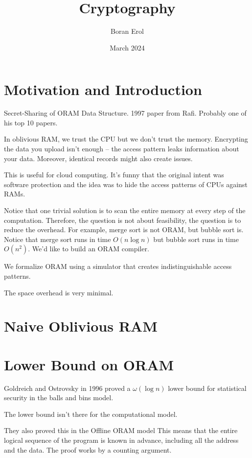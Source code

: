 \documentclass{article}
\title{Cryptography}
\date{March 2024}
\author{Boran Erol}
\theoremstyle{definition}
\begin{document}
\maketitle

\section{Motivation and Introduction}

Secret-Sharing of ORAM Data Structure. 1997 paper from Rafi. Probably one of his top 10 papers.

In oblivious RAM, we trust the CPU but we don't trust the memory. Encrypting the data you upload isn't enough -- 
the access pattern leaks information about your data. Moreover, identical records might also create issues.

This is useful for cloud computing. It's funny that the original intent was software protection and the idea
was to hide the access patterns of CPUs against RAMs.

Notice that one trivial solution is to scan the entire memory at every step of the computation.
Therefore, the question is not about feasibility, the question is to reduce the overhead.
For example, merge sort is not ORAM, but bubble sort is. Notice that merge sort runs in time $O(n \log n)$
but bubble sort runs in time $O(n^2)$.
We'd like to build an ORAM compiler.

We formalize ORAM using a simulator that creates indistinguishable access patterns.

The space overhead is very minimal.


\newpage

\section{Naive Oblivious RAM}



\newpage

\section{Lower Bound on ORAM}

Goldreich and Ostrovsky in 1996 proved a $\omega(\log n)$ lower bound for statistical security in the
balls and bins model.

The lower bound isn't there for the computational model.

They also proved this in the Offline ORAM model This means that the entire logical sequence of the program is known in
advance, including all the address and the data. The proof works by a counting argument.
\end{document}
